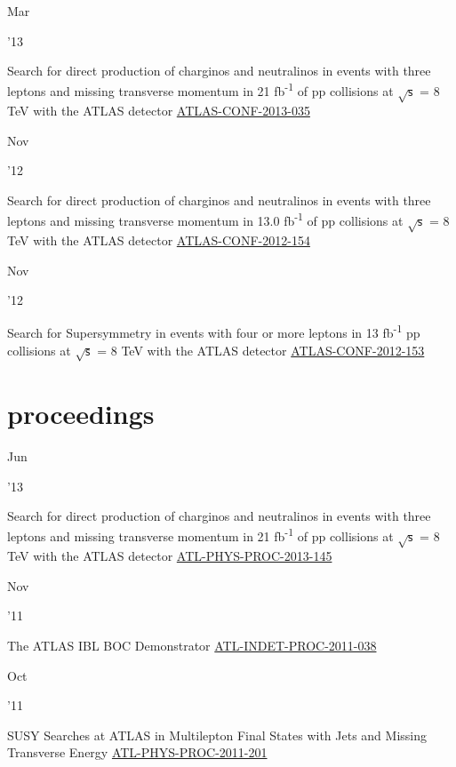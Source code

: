 \documentclass[]{cv} %
\begin{document}
\begin{entrylist}
  \entry
  {\parbox[t]{\parboxWidthOne}{Mar}\parbox[t]{\parboxWidthTwo}{\hfill '13}}
  {Search for direct production of charginos and neutralinos in events with three leptons and missing transverse momentum in 21
    fb\textsuperscript{-1} of pp collisions at $\sqrt{\mathsf{s}}$ = 8 TeV with the ATLAS detector}
    {\href{https://cds.cern.ch/record/1532426}{ATLAS-CONF-2013-035}}
    {\vspace*{\spacingPubs}}

    \entry
    {\parbox[t]{\parboxWidthOne}{Nov}\parbox[t]{\parboxWidthTwo}{\hfill '12}}
    {Search for direct production of charginos and neutralinos in events with three leptons and missing transverse momentum in 13.0
      fb\textsuperscript{-1} of pp collisions at $\sqrt{\mathsf{s}}$ = 8 TeV with the ATLAS detector}
      {\href{https://cds.cern.ch/record/1493493}{ATLAS-CONF-2012-154}}
      {\vspace*{\spacingPubs}}

      \entry
      {\parbox[t]{\parboxWidthOne}{Nov}\parbox[t]{\parboxWidthTwo}{\hfill '12}}
      {Search for Supersymmetry in events with four or more leptons in 13 fb\textsuperscript{-1} pp collisions at $\sqrt{\mathsf{s}}$
    = 8 TeV with the ATLAS detector}
    {\href{https://cds.cern.ch/record/1493492}{ATLAS-CONF-2012-153}}
    {\vspace*{\spacingPubs}}

\end{entrylist}

\section{proceedings}
\begin{entrylist}

\entry
{\parbox[t]{\parboxWidthOne}{Jun}\parbox[t]{\parboxWidthTwo}{\hfill '13}}
{Search for direct production of charginos and neutralinos in events with three leptons and missing transverse momentum in 21
  fb\textsuperscript{-1} of pp collisions at $\sqrt{\mathsf{s}}$ = 8 TeV with the ATLAS detector}
  {\href{https://cds.cern.ch/record/1554811}{ATL-PHYS-PROC-2013-145}}
  {\vspace*{\spacingPubs}}

  \entry
  {\parbox[t]{\parboxWidthOne}{Nov}\parbox[t]{\parboxWidthTwo}{\hfill '11}}
  {The ATLAS IBL BOC Demonstrator}
  {\href{https://cds.cern.ch/record/1401224}{ATL-INDET-PROC-2011-038}}
  {\vspace*{\spacingPubs}}

  \entry
  {\parbox[t]{\parboxWidthOne}{Oct}\parbox[t]{\parboxWidthTwo}{\hfill '11}}
  {SUSY Searches at ATLAS in Multilepton Final States with Jets and Missing Transverse Energy}
  {\href{https://cds.cern.ch/record/1394331}{ATL-PHYS-PROC-2011-201}}
  {\vspace*{\spacingPubs}}

\end{entrylist}
\end{document}
